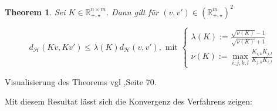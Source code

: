 \documentclass[11pt,a4paper]{article}
\newtheorem{theorem}{Theorem}[subsection]
\numberwithin{equation}{section}
\begin{document}
	\begin{theorem}\label{theorem41}
		Sei $K \in \mathbb{R}_{+,\star}^{n \times m}$. Dann gilt für $(v,v') \in (\mathbb{R}_{+, \star}^m)^2$
		
		\begin{equation}
		d_\mathcal{H}(Kv,Kv') \leq \lambda (K) d_\mathcal{H}(v,v'), \text{ mit } \begin{cases}
		\lambda (K) := \frac{\sqrt{\nu (K)} -1}{\sqrt{\nu (K)}+1}\\
		\nu (K) := \max_{i,j,k,l} \frac{K_{i,k}K_{j,l}}{K_{j,k}K_{i,l}}
		
		\end{cases}
		\end{equation}
	\end{theorem}
	
	Visualisierung des Theorems vgl \cite{COTcuturi},Seite 70.
	
	Mit diesem Resultat lässt sich die Konvergenz des Verfahrens zeigen:
	
\end{document}
